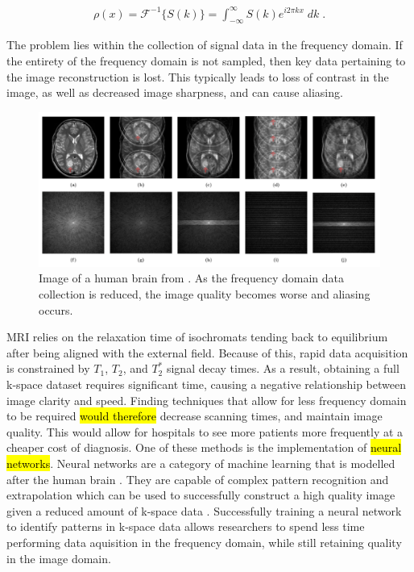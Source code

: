\documentclass[14pt]{extreport}
\begin{document}
        \begin{align}
            \rho(x) = \mathcal{F}^{-1}\{ S(k) \} = \int_{-\infty}^{\infty} S(k) e^{i 2\pi k x} \;dk\;. \label{fft}
        \end{align}

        The problem lies within the collection of signal data in the frequency domain. If the entirety of the frequency domain is not sampled, then key data pertaining to the image reconstruction is lost. This typically leads to loss of contrast in the image, as well as decreased image sharpness, and can cause aliasing. 
        
        \begin{figure}[h]
            \begin{center}
                \includegraphics[width = \linewidth]{Brain Images.png}
                \caption{Image of a human brain from \cite{Hyun_Kim_Lee_Lee_Seo_2018}. As the frequency domain data collection is reduced, the image quality becomes worse and aliasing occurs.}
            \end{center}
        \end{figure}

        MRI relies on the relaxation time of isochromats tending back to equilibrium after being aligned with the external field. Because of this, rapid data acquisition is constrained by $T_1$, $T_2$, and $T_2^*$ signal decay times. As a result, obtaining a full k-space dataset requires significant time, causing a negative relationship between image clarity and speed. Finding techniques that allow for less frequency domain to be required \hl{would therefore} decrease scanning times, and maintain image quality. This would allow for hospitals to see more patients more frequently at a cheaper cost of diagnosis. One of these methods is the implementation of \hl{neural networks}. Neural networks are a category of machine learning that is modelled after the human brain \cite{Pytorch_Book}. They are capable of complex pattern recognition and extrapolation which can be used to successfully construct a high quality image given a reduced amount of k-space data \cite{Hammernik_Klatzer_Kobler_Recht_Sodickson_Pock_Knoll_2018}. Successfully training a neural network to identify patterns in k-space data allows researchers to spend less time performing data aquisition in the frequency domain, while still retaining quality in the image domain.
    
\end{document}
